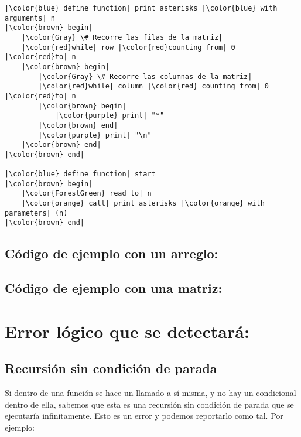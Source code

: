 \documentclass[titlepage]{article}
\begin{document}
\begin{lstlisting}
|\color{blue} define function| print_asterisks |\color{blue} with arguments| n
|\color{brown} begin|
    |\color{Gray} \# Recorre las filas de la matriz|
    |\color{red}while| row |\color{red}counting from| 0 |\color{red}to| n
    |\color{brown} begin|
        |\color{Gray} \# Recorre las columnas de la matriz|
        |\color{red}while| column |\color{red} counting from| 0 |\color{red}to| n
        |\color{brown} begin|
            |\color{purple} print| "*"
        |\color{brown} end|
        |\color{purple} print| "\n"
    |\color{brown} end|
|\color{brown} end|

|\color{blue} define function| start
|\color{brown} begin|
    |\color{ForestGreen} read to| n
    |\color{orange} call| print_asterisks |\color{orange} with parameters| (n)
|\color{brown} end|
\end{lstlisting}


\subsection{Código de ejemplo con un arreglo: }


\subsection{Código de ejemplo con una matriz: }


\section{Error lógico que se detectará: }

\subsection{Recursión sin condición de parada}
Si dentro de una función se hace un llamado a sí misma, y no hay un condicional dentro de ella, sabemos que esta es una recursión sin condición de parada que se ejecutaría infinitamente. Esto es un error y podemos reportarlo como tal. Por ejemplo:


\end{document}
